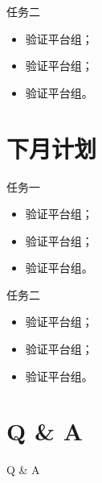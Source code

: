 \documentclass[cjk]{beamer}
\begin{document}
\begin{CJK}{UTF8}{gbsn}
  \begin{frame}
    \begin{block}{任务二}
      \begin{itemize}
      \item 验证平台组；
      \item 验证平台组；
      \item 验证平台组。
      \end{itemize}
    \end{block}
  \end{frame}

  \section{下月计划} %

  \begin{frame}
    \begin{block}{任务一}
      \begin{itemize}
      \item 验证平台组；
      \item 验证平台组；
      \item 验证平台组。
      \end{itemize}
    \end{block}
    \begin{block}{任务二}
      \begin{itemize}
      \item 验证平台组；
      \item 验证平台组；
      \item 验证平台组。
      \end{itemize}
    \end{block}
  \end{frame}

  \section{Q \& A}

  \begin{frame}
    \Huge{\centerline{Q \& A}}
  \end{frame}


\end{CJK}
\end{document}
